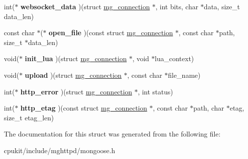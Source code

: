 \begin{DoxyCompactItemize}
int($\ast$ {\bfseries websocket\+\_\+data} )(struct \mbox{\hyperlink{structmg__connection}{mg\+\_\+connection}} $\ast$, int bits, char $\ast$data, size\+\_\+t data\+\_\+len)
\item 
\mbox{\label{structmg__callbacks_a44db42146fce9822bca0b1fa63ea3e8e}} 
const char $\ast$($\ast$ {\bfseries open\+\_\+file} )(const struct \mbox{\hyperlink{structmg__connection}{mg\+\_\+connection}} $\ast$, const char $\ast$path, size\+\_\+t $\ast$data\+\_\+len)
\item 
\mbox{\label{structmg__callbacks_a19adc2998f58590c35b4257e7a6b7229}} 
void($\ast$ {\bfseries init\+\_\+lua} )(struct \mbox{\hyperlink{structmg__connection}{mg\+\_\+connection}} $\ast$, void $\ast$lua\+\_\+context)
\item 
\mbox{\label{structmg__callbacks_af150d5551bce58f1e008f93fba76d129}} 
void($\ast$ {\bfseries upload} )(struct \mbox{\hyperlink{structmg__connection}{mg\+\_\+connection}} $\ast$, const char $\ast$file\+\_\+name)
\item 
\mbox{\label{structmg__callbacks_a2a5283c3f91bbb5bbcf720c4d4a90b32}} 
int($\ast$ {\bfseries http\+\_\+error} )(struct \mbox{\hyperlink{structmg__connection}{mg\+\_\+connection}} $\ast$, int status)
\item 
\mbox{\label{structmg__callbacks_abe3f4e609f85e04f996feca4351b8da3}} 
int($\ast$ {\bfseries http\+\_\+etag} )(const struct \mbox{\hyperlink{structmg__connection}{mg\+\_\+connection}} $\ast$, const char $\ast$path, char $\ast$etag, size\+\_\+t etag\+\_\+len)
\end{DoxyCompactItemize}


The documentation for this struct was generated from the following file\+:\begin{DoxyCompactItemize}
\item 
cpukit/include/mghttpd/mongoose.\+h\end{DoxyCompactItemize}
